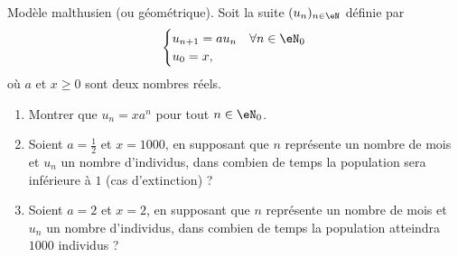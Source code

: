 


\begin{exercice}\label{exoTD3-0002}

	Modèle malthusien (ou géométrique). Soit la suite $(u_n)_{n\in\eN}$ définie par
	\begin{equation}
		\begin{cases}
			u_{n+1}=au_n	&	\text{$\forall n\in\eN_0$}\\
			u_0=x,
		\end{cases}
	\end{equation}
	où $a$ et $x\geq 0$ sont deux nombres réels.

	\begin{enumerate}
		\item
			Montrer que $u_n=xa^n$ pour tout $n\in\eN_0$.
		\item
			Soient $a=\frac{ 1 }{2}$ et $x=1000$, en supposant que $n$ représente un nombre de mois et $u_n$ un nombre d'individus, dans combien de temps la population sera inférieure à $1$ (cas d'extinction) ?
		\item
			Soient $a=2$ et $x=2$, en supposant que $n$ représente un nombre de mois et $u_n$ un nombre d'individus, dans combien de temps la population atteindra $1000$ individus ?

	\end{enumerate}

\end{exercice}
